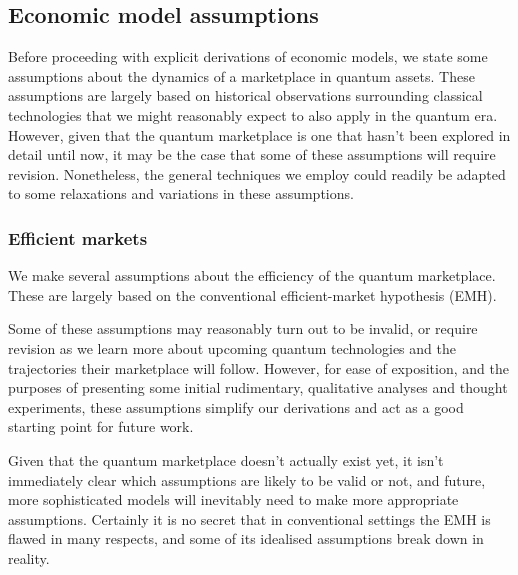 \documentclass[aps, rmp, twocolumn, amsmath, amssymb, nofootinbib, superscriptaddress, longbibliography, floatfix, table-of-contents, eqsecnum]{revtex4-1}
\begin{document}
%
%

\subsection{Economic model assumptions}

Before proceeding with explicit derivations of economic models, we state some assumptions about the dynamics of a marketplace in quantum assets. These assumptions are largely based on historical observations surrounding classical technologies that we might reasonably expect to also apply in the quantum era. However, given that the quantum marketplace is one that hasn't been explored in detail until now, it may be the case that some of these assumptions will require revision. Nonetheless, the general techniques we employ could readily be adapted to some relaxations and variations in these assumptions.

%

\subsubsection{Efficient markets} 

We make several assumptions about the efficiency of the quantum marketplace. These are largely based on the conventional efficient-market hypothesis (EMH).

Some of these assumptions may reasonably turn out to be invalid, or require revision as we learn more about upcoming quantum technologies and the trajectories their marketplace will follow. However, for ease of exposition, and the purposes of presenting some initial rudimentary, qualitative analyses and thought experiments, these assumptions simplify our derivations and act as a good starting point for future work.

Given that the quantum marketplace doesn't actually exist yet, it isn't immediately clear which assumptions are likely to be valid or not, and future, more sophisticated models will inevitably need to make more appropriate assumptions. Certainly it is no secret that in conventional settings the EMH is flawed in many respects, and some of its idealised assumptions break down in reality.
\end{document}
